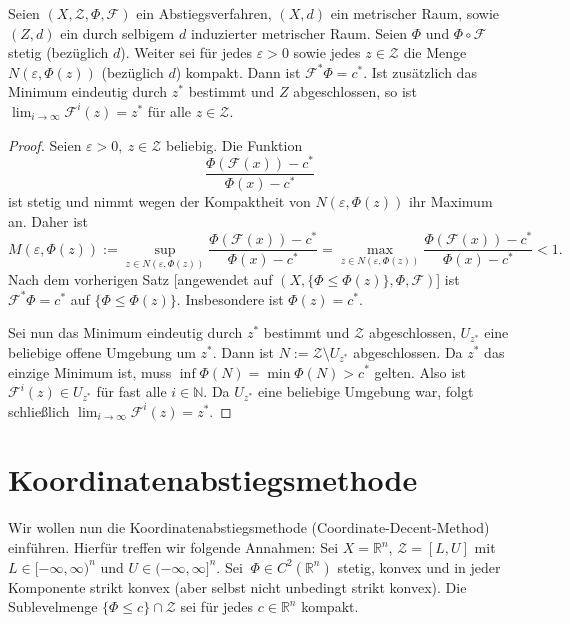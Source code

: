 \begin{korollar}
	\label{satz-abstiegsverfahren-konv}
	Seien $(X, \mathcal{Z}, \Phi, \mathcal{F})$ ein Abstiegsverfahren, $(X,d)$ ein metrischer Raum, sowie $(Z,d)$ ein durch selbigem $d$ induzierter metrischer Raum. Seien $\Phi$ und $\Phi \circ \mathcal{F}$ stetig (bezüglich $d$). Weiter sei für jedes $\varepsilon > 0$ sowie jedes $z \in \mathcal{Z}$ die Menge $N(\varepsilon, \Phi(z))$ (bezüglich $d$) kompakt. Dann ist $\mathcal{F}^* \Phi = c^*$. Ist zusätzlich das Minimum eindeutig durch $z^*$ bestimmt und $Z$ abgeschlossen, so ist $\lim_{i \rightarrow \infty} \mathcal{F}^i(z) = z^*$ für alle $z \in \mathcal{Z}$.
\end{korollar}
\begin{proof}
	Seien $\varepsilon > 0,\ z \in \mathcal{Z}$ beliebig. Die Funktion 
	$$	
	\frac{\Phi(\mathcal{F}(x)) - c^*}{\Phi(x) - c^*}
	$$ ist stetig und nimmt wegen der Kompaktheit von $N(\varepsilon, \Phi(z))$ ihr Maximum an. Daher ist
	$$
	M(\varepsilon, \Phi(z)) := 
	\sup_{z \in N(\varepsilon, \Phi(z))} \frac{\Phi(\mathcal{F}(x)) - c^*}{\Phi(x) - c^*} = 
	\max_{z \in N(\varepsilon, \Phi(z))} \frac{\Phi(\mathcal{F}(x)) - c^*}{\Phi(x) - c^*}
	< 1.
	$$
	Nach dem vorherigen Satz [angewendet auf 
	$(X, \{ \Phi \leq \Phi(z) \}, \Phi, \mathcal{F})$] 
	ist $\mathcal{F}^* \Phi = c^*$ auf $\{ \Phi \leq \Phi(z) \}$. Insbesondere ist $\Phi(z) = c^*$. 
	
	Sei nun das Minimum eindeutig durch $z^*$ bestimmt und $\mathcal{Z}$ abgeschlossen, $U_{z^*}$ eine beliebige offene Umgebung um $z^*$. Dann ist $N := \mathcal{Z} \setminus U_{z^*}$ abgeschlossen. Da $z^*$ das einzige Minimum ist, muss $\inf \Phi(N) = \min \Phi(N) > c^*$ gelten. Also ist $\mathcal{F}^i(z) \in U_{z^*}$ für fast alle $i \in \mathbb{N}$. Da $U_{z^*}$ eine beliebige Umgebung war, folgt schließlich $\lim_{i \rightarrow \infty} \mathcal{F}^i(z) = z^*$.
\end{proof}


\section{Koordinatenabstiegsmethode}
Wir wollen nun  die Koordinatenabstiegsmethode (Coordinate-Decent-Method) einführen. Hierfür treffen wir folgende Annahmen:
Sei $X = \mathbb{R}^n$, $\mathcal{Z} = [L,U]$ mit $L \in [-\infty, \infty)^n$ und $U \in (-\infty, \infty]^n$. Sei  $\ \Phi \in C^2(\mathbb{R}^n)$ stetig, konvex und in jeder Komponente strikt konvex (aber selbst nicht unbedingt strikt konvex). Die Sublevelmenge $\{ \Phi \leq c \} \cap \mathcal{Z}$ sei für jedes $c \in \mathbb{R}^n$ kompakt. 

